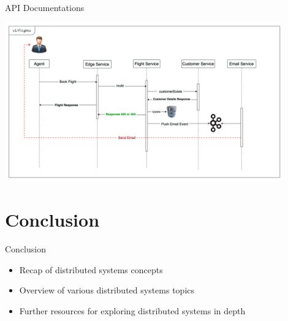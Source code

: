 \documentclass{beamer}
\begin{document}
\begin{frame}{API Documentations}
  \begin{center}
    \includegraphics[width=0.9\textwidth]{img/sd.png} 
  \end{center} 
\end{frame}

\section{Conclusion}
\begin{frame}{Conclusion}
  \begin{itemize}
    \item Recap of distributed systems concepts
    \item Overview of various distributed systems topics
    \item Further resources for exploring distributed systems in depth
  \end{itemize}
\end{frame}
\end{document}
